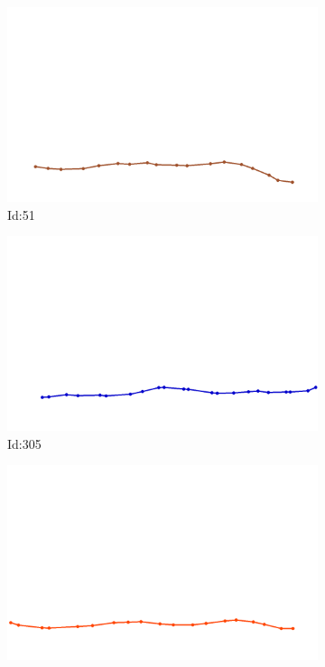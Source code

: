 \documentclass[12pt,twoside]{report}
\begin{document}
\begin{figure}
\centering
\begin{subfigure}[b]{0.20\textwidth}
\centering
\includegraphics[width=\textwidth]{../../trajectories/51.png}
\caption{Id:51}
\end{subfigure}
\begin{subfigure}[b]{0.20\textwidth}
\centering
\includegraphics[width=\textwidth]{../../trajectories/305.png}
\caption{Id:305}
\end{subfigure}
\begin{subfigure}[b]{0.20\textwidth}
\centering
\includegraphics[width=\textwidth]{../../trajectories/307.png}

\end{subfigure}
\end{figure}
\end{document}
